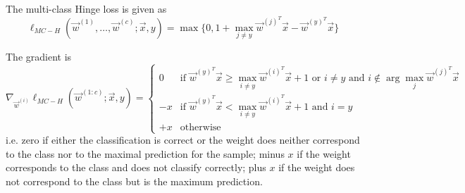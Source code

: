 The multi-class Hinge loss is given as
\begin{equation*}
    \ell_{MC-H}(\vec{w}^{(1)}, \dotsc, \vec{w}^{(c)}; \vec{x}, y)
    = \max{\{0, 1 +
            \max_{j \neq y}
            {\vec{w}^{(j)^T}\vec{x} - \vec{w}^{(y)^T}\vec{x}}
    \}}
\end{equation*}

The gradient is
\begin{equation*}
    \nabla_{\vec{w}^{(i)}} \ell_{MC-H}(\vec{w}^{(1:c)}; \vec{x}, y) =
    \begin{cases}
        0 & \text{if $\vec{w}^{(y)^T} \vec{x} \geq \max_{i \neq y}{\vec{w}^{(i)^T}\vec{x}} + 1$ or $i \neq y$ and $i \notin \arg\max_j{\vec{w}^{(j)^T} \vec{x}}$} \\
        -x & \text{if $\vec{w}^{(y)^T} \vec{x} < \max_{i \neq y}{\vec{w}^{(i)^T}\vec{x}} + 1$ and $i = y$} \\
        +x & \text{otherwise}
    \end{cases}
\end{equation*}
i.e. zero if either the classification is correct or the
weight does neither correspond to the class nor to the
maximal prediction for the sample;
minus $x$ if the weight corresponds to the class and does
not classify correctly;
plus $x$ if the weight does not correspond to the class
but is the maximum prediction.
